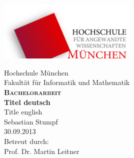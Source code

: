 \graphicspath{{pictures/}}
\begin{titlepage}	
		
	\begin{minipage}[b]{1.0\textwidth}
		\centering
		\includegraphics[width=0.5\textwidth]{hm_logo_svg.pdf}
		\vspace*{0.6cm}
	\end{minipage}
	
	\begin{minipage}{1.0\textwidth} 
		\centering	
		{\Large Hochschule München}\\[0.5cm]
		{\Large Fakultät für Informatik und Mathematik}\\[1.0cm]
		\textsc{\sffamily \LARGE \bfseries Bachelorarbeit}\\[1.0cm]
		{\sffamily \LARGE \bfseries Titel deutsch}\\[1.0cm]	
		{\sffamily \LARGE Title english}\\[2.0cm]	
		{\Large Sebastian Stumpf}\\[0.5cm]
		{\Large 30.09.2013}\\[2cm]
		{\Large Betreut durch:}\\[0.5cm]
		{\Large Prof. Dr. Martin Leitner}\\[0.5cm]
	\end{minipage}
	
\end{titlepage}
